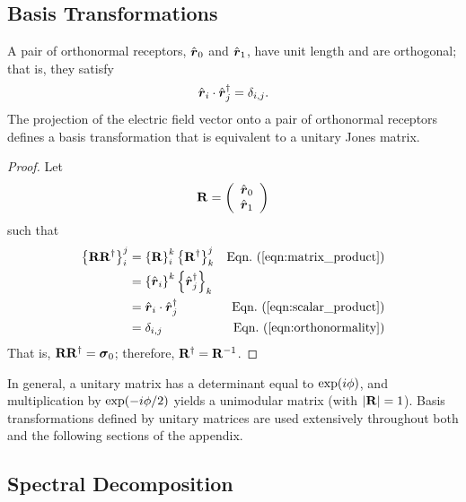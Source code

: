 \subsection{Basis Transformations}
\label{app:basis_transformations}

A pair of orthonormal receptors, $\hat{\mbox{\boldmath $r$}}_0$ and $\hat{\mbox{\boldmath $r$}}_1$, have unit length and are orthogonal; that is, they satisfy
%
\begin{equation}
\hat{\mbox{\boldmath $r$}}_i \cdot \hat{\mbox{\boldmath $r$}}_j^\dagger = \delta_{i,j}.
\label{eqn:orthonormality}
\end{equation}
%
The projection of the electric field vector onto a pair of orthonormal receptors defines a basis transformation that is equivalent to a unitary Jones matrix.
%
\begin{proof}
\label{proof:orthonormal_receptors}
Let 
$${\bf R} = \left( \begin{array}{c}
		\hat{\mbox{\boldmath $r$}}_0 \\
		\hat{\mbox{\boldmath $r$}}_1
	\end{array} \right)$$
such that 
\begin{align*}
\left\{ \JM{R} \JM{R}^\dagger \right\}_i^j 
& = \left\{ \JM{R} \right\}_i^k \left\{ \JM{R}^\dagger \right\}_k^j
  & \peqn{matrix_product} \\
& = \left\{ \hat{\Jrow{r}}_i \right\}^k \left\{ \hat{\Jrow{r}}_j^\dagger \right\}_k  \\
& = \hat{\Jrow{r}}_i \cdot \hat{\Jrow{r}}_j^\dagger 
  & \peqn{scalar_product} \\
& = \delta_{i,j} 
  & \peqn{orthonormality}
\end{align*}
That is, ${\bf R} {\bf R}^\dagger = \mbox{\boldmath $\sigma$}_{0}$; 
therefore, ${\bf R}^\dagger={\bf R}^{-1}$.
\end{proof}
%
In general, a unitary matrix has a determinant equal to $\exp(i\phi)$, and
multiplication by $\exp(-i\phi/2)$ yields a unimodular matrix
(with $|{\bf R}|=1$).
%
Basis transformations defined by unitary matrices are used extensively throughout both  and the following sections of the appendix.  

\subsection{Spectral Decomposition}
\label{app:spectral_decomposition}

